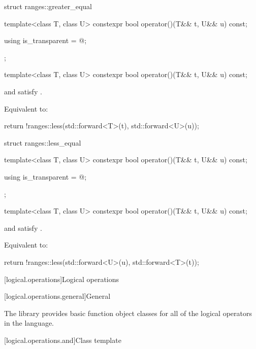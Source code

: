 %
\begin{codeblock}
struct ranges::greater_equal {
  template<class T, class U>
    constexpr bool operator()(T&& t, U&& u) const;

  using is_transparent = @\unspecnc@;
};
\end{codeblock}

\begin{itemdecl}
template<class T, class U>
  constexpr bool operator()(T&& t, U&& u) const;
\end{itemdecl}

\begin{itemdescr}
\pnum
\constraints
{} and  satisfy .

\pnum
\effects
Equivalent to:
\begin{codeblock}
return !ranges::less{}(std::forward<T>(t), std::forward<U>(u));
\end{codeblock}
\end{itemdescr}

%
\begin{itemdecl}
struct ranges::less_equal {
  template<class T, class U>
    constexpr bool operator()(T&& t, U&& u) const;

  using is_transparent = @\unspecnc@;
};
\end{itemdecl}

\begin{itemdecl}
template<class T, class U>
  constexpr bool operator()(T&& t, U&& u) const;
\end{itemdecl}

\begin{itemdescr}
\pnum
\constraints
{} and  satisfy .

\pnum
\effects
Equivalent to:
\begin{codeblock}
return !ranges::less{}(std::forward<U>(u), std::forward<T>(t));
\end{codeblock}
\end{itemdescr}

[logical.operations]{Logical operations}

[logical.operations.general]{General}

\pnum
The library provides basic function object classes for all of the logical
operators in the language.

[logical.operations.and]{Class template }

